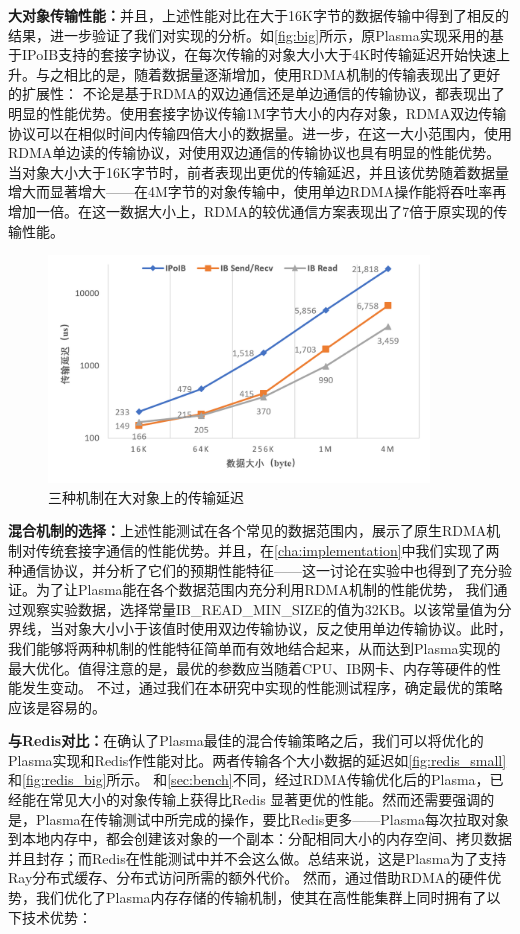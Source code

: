 \textbf{大对象传输性能：}并且，上述性能对比在大于16K字节的数据传输中得到了相反的结果，进一步验证了我们对实现的分析。如\autoref{fig:big}所示，原Plasma实现采用的基于IPoIB支持的套接字协议，在每次传输的对象大小大于4K时传输延迟开始快速上升。与之相比的是，随着数据量逐渐增加，使用RDMA机制的传输表现出了更好的扩展性：
不论是基于RDMA的双边通信还是单边通信的传输协议，都表现出了明显的性能优势。使用套接字协议传输1M字节大小的内存对象，RDMA双边传输协议可以在相似时间内传输四倍大小的数据量。进一步，在这一大小范围内，使用RDMA单边读的传输协议，对使用双边通信的传输协议也具有明显的性能优势。
当对象大小大于16K字节时，前者表现出更优的传输延迟，并且该优势随着数据量增大而显著增大——在4M字节的对象传输中，使用单边RDMA操作能将吞吐率再增加一倍。在这一数据大小上，RDMA的较优通信方案表现出了7倍于原实现的传输性能。

\begin{figure}[h]
	\centering
	\includegraphics[width=0.9\textwidth]{image/chap04/big.png}
	\caption{三种机制在大对象上的传输延迟}
	\label{fig:big}
\end{figure}

\textbf{混合机制的选择：}上述性能测试在各个常见的数据范围内，展示了原生RDMA机制对传统套接字通信的性能优势。并且，在\autoref{cha:implementation}中我们实现了两种通信协议，并分析了它们的预期性能特征——这一讨论在实验中也得到了充分验证。为了让Plasma能在各个数据范围内充分利用RDMA机制的性能优势，
我们通过观察实验数据，选择常量IB\_READ\_MIN\_SIZE的值为32KB。以该常量值为分界线，当对象大小小于该值时使用双边传输协议，反之使用单边传输协议。此时，我们能够将两种机制的性能特征简单而有效地结合起来，从而达到Plasma实现的最大优化。值得注意的是，最优的参数应当随着CPU、IB网卡、内存等硬件的性能发生变动。
不过，通过我们在本研究中实现的性能测试程序，确定最优的策略应该是容易的。

\textbf{与Redis对比：}在确认了Plasma最佳的混合传输策略之后，我们可以将优化的Plasma实现和Redis作性能对比。两者传输各个大小数据的延迟如\autoref{fig:redis_small}和\autoref{fig:redis_big}所示。
和\autoref{sec:bench}不同，经过RDMA传输优化后的Plasma，已经能在常见大小的对象传输上获得比Redis
显著更优的性能。然而还需要强调的是，Plasma在传输测试中所完成的操作，要比Redis更多——Plasma每次拉取对象到本地内存中，都会创建该对象的一个副本：分配相同大小的内存空间、拷贝数据并且封存；而Redis在性能测试中并不会这么做。总结来说，这是Plasma为了支持Ray分布式缓存、分布式访问所需的额外代价。
然而，通过借助RDMA的硬件优势，我们优化了Plasma内存存储的传输机制，使其在高性能集群上同时拥有了以下技术优势：

